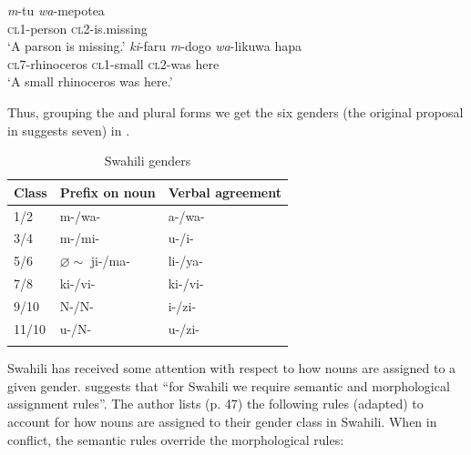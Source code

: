 \begin{exe}
    \ex
    \begin{xlist}
        \ex \label{swahili-class-exe-cl1}
        \gll \textit{m}-tu \textit{wa}-mepotea\\ 
         \textsc{cl1}-person \textsc{cl2}-is.missing\\
        \glt `A parson is missing.'
        \ex \label{swahili-class-exe-cl2}
        \gll \textit{ki}-faru \textit{m}-dogo \textit{wa}-likuwa hapa\\
         \textsc{cl7}-rhinoceros \textsc{cl1}-small \textsc{cl2}-was here\\
        \glt `A small rhinoceros was here.'
    \end{xlist}
\end{exe}

Thus, grouping the  and plural forms we get the six genders (the  original proposal in \textcite[47]{Corbett.1991} suggests seven) in .

\begin{table}
  \centering
  \begin{tabular}{lll}
    \lsptoprule
    Class & Prefix on noun             & Verbal agreement \\
    \midrule
    1/2   & m-/wa-                     & a-/wa-           \\
    3/4   & m-/mi-                     & u-/i-            \\
    5/6   & $\varnothing \sim$ ji-/ma- & li-/ya-          \\
    7/8   & ki-/vi-                    & ki-/vi-          \\
    9/10  & N-/N-                      & i-/zi-           \\
    11/10 & u-/N-                      & u-/zi-           \\
    \lspbottomrule
  \end{tabular}
  \caption{Swahili genders}\label{tab:genders-swahili}
\end{table}

Swahili has received some attention with respect to how nouns are assigned to a given gender. \textcite[47]{Corbett.1991} suggests that ``for Swahili we require semantic and morphological assignment rules''. The author lists (p. 47) the following rules (adapted) to account for how nouns are assigned to their gender class in Swahili. When in conflict, the semantic rules override the morphological rules:\\

